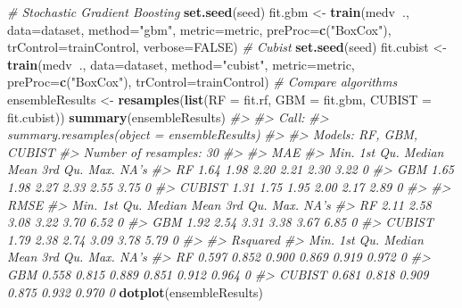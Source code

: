 \documentclass[]{book}
\newenvironment{Shaded}{\begin{snugshade}}{\end{snugshade}}
\newcommand{\CommentTok}[1]{\textcolor[rgb]{0.56,0.35,0.01}{\textit{#1}}}
\newcommand{\DataTypeTok}[1]{\textcolor[rgb]{0.13,0.29,0.53}{#1}}
\newcommand{\KeywordTok}[1]{\textcolor[rgb]{0.13,0.29,0.53}{\textbf{#1}}}
\newcommand{\NormalTok}[1]{#1}
\newcommand{\OperatorTok}[1]{\textcolor[rgb]{0.81,0.36,0.00}{\textbf{#1}}}
\newcommand{\OtherTok}[1]{\textcolor[rgb]{0.56,0.35,0.01}{#1}}
\newcommand{\StringTok}[1]{\textcolor[rgb]{0.31,0.60,0.02}{#1}}
\begin{document}
\begin{Shaded}
\begin{Highlighting}[]
\CommentTok{# Stochastic Gradient Boosting}
\KeywordTok{set.seed}\NormalTok{(seed)}
\NormalTok{fit.gbm <-}\StringTok{ }\KeywordTok{train}\NormalTok{(medv}\OperatorTok{~}\NormalTok{., }\DataTypeTok{data=}\NormalTok{dataset, }\DataTypeTok{method=}\StringTok{"gbm"}\NormalTok{, }\DataTypeTok{metric=}\NormalTok{metric, }
                 \DataTypeTok{preProc=}\KeywordTok{c}\NormalTok{(}\StringTok{"BoxCox"}\NormalTok{), }
                 \DataTypeTok{trControl=}\NormalTok{trainControl, }\DataTypeTok{verbose=}\OtherTok{FALSE}\NormalTok{)}
\CommentTok{# Cubist}
\KeywordTok{set.seed}\NormalTok{(seed)}
\NormalTok{fit.cubist <-}\StringTok{ }\KeywordTok{train}\NormalTok{(medv}\OperatorTok{~}\NormalTok{., }\DataTypeTok{data=}\NormalTok{dataset, }\DataTypeTok{method=}\StringTok{"cubist"}\NormalTok{, }\DataTypeTok{metric=}\NormalTok{metric, }
                    \DataTypeTok{preProc=}\KeywordTok{c}\NormalTok{(}\StringTok{"BoxCox"}\NormalTok{), }\DataTypeTok{trControl=}\NormalTok{trainControl)}
\CommentTok{# Compare algorithms}
\NormalTok{ensembleResults <-}\StringTok{ }\KeywordTok{resamples}\NormalTok{(}\KeywordTok{list}\NormalTok{(}\DataTypeTok{RF  =}\NormalTok{ fit.rf, }
                                  \DataTypeTok{GBM =}\NormalTok{ fit.gbm, }
                                  \DataTypeTok{CUBIST =}\NormalTok{ fit.cubist))}
\KeywordTok{summary}\NormalTok{(ensembleResults)}
\CommentTok{#> }
\CommentTok{#> Call:}
\CommentTok{#> summary.resamples(object = ensembleResults)}
\CommentTok{#> }
\CommentTok{#> Models: RF, GBM, CUBIST }
\CommentTok{#> Number of resamples: 30 }
\CommentTok{#> }
\CommentTok{#> MAE }
\CommentTok{#>        Min. 1st Qu. Median Mean 3rd Qu. Max. NA's}
\CommentTok{#> RF     1.64    1.98   2.20 2.21    2.30 3.22    0}
\CommentTok{#> GBM    1.65    1.98   2.27 2.33    2.55 3.75    0}
\CommentTok{#> CUBIST 1.31    1.75   1.95 2.00    2.17 2.89    0}
\CommentTok{#> }
\CommentTok{#> RMSE }
\CommentTok{#>        Min. 1st Qu. Median Mean 3rd Qu. Max. NA's}
\CommentTok{#> RF     2.11    2.58   3.08 3.22    3.70 6.52    0}
\CommentTok{#> GBM    1.92    2.54   3.31 3.38    3.67 6.85    0}
\CommentTok{#> CUBIST 1.79    2.38   2.74 3.09    3.78 5.79    0}
\CommentTok{#> }
\CommentTok{#> Rsquared }
\CommentTok{#>         Min. 1st Qu. Median  Mean 3rd Qu.  Max. NA's}
\CommentTok{#> RF     0.597   0.852  0.900 0.869   0.919 0.972    0}
\CommentTok{#> GBM    0.558   0.815  0.889 0.851   0.912 0.964    0}
\CommentTok{#> CUBIST 0.681   0.818  0.909 0.875   0.932 0.970    0}
\KeywordTok{dotplot}\NormalTok{(ensembleResults)}
\end{Highlighting}
\end{Shaded}
\end{document}
